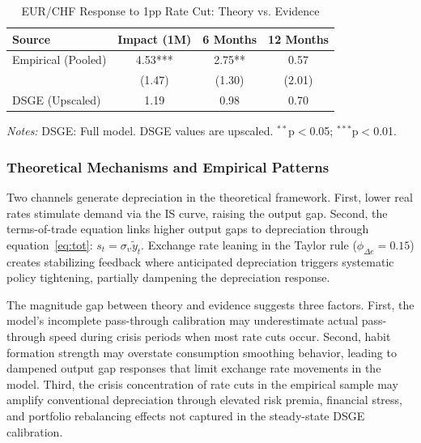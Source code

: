 \documentclass[12pt,a4paper]{article}
\begin{document}
\begin{table}[H]
	\centering
	\caption{EUR/CHF Response to 1pp Rate Cut: Theory vs. Evidence}
	\label{tab:fx_comparison}
	\small
	\begin{threeparttable}
		\begin{tabular}{@{}lccc@{}}
			\toprule
			\textbf{Source} & \textbf{Impact (1M)} & \textbf{6 Months} & \textbf{12 Months} \\
			\midrule
			Empirical (Pooled) & 4.53*** & 2.75** & 0.57 \\
			& (1.47) & (1.30) & (2.01) \\
			\midrule
			DSGE (Upscaled) & 1.19 & 0.98 & 0.70 \\
			\bottomrule
		\end{tabular}
		\begin{tablenotes}
			\footnotesize
			\item \textit{Notes:} DSGE: Full model. DSGE values are upscaled. $^{**}$p$<$0.05; $^{***}$p$<$0.01.
		\end{tablenotes}
	\end{threeparttable}
\end{table}

\subsubsection{Theoretical Mechanisms and Empirical Patterns}
Two channels generate depreciation in the theoretical framework. First, lower real rates stimulate demand via the IS curve, raising the output gap. Second, the terms-of-trade equation links higher output gaps to depreciation through equation~\eqref{eq:tot}: $s_t = \sigma_\upsilon\tilde{y}_t$. Exchange rate leaning in the Taylor rule ($\phi_{\Delta e} = 0.15$) creates stabilizing feedback where anticipated depreciation triggers systematic policy tightening, partially dampening the depreciation response.

The magnitude gap between theory and evidence suggests three factors. First, the model's incomplete pass-through calibration may underestimate actual pass-through speed during crisis periods when most rate cuts occur. Second, habit formation strength may overstate consumption smoothing behavior, leading to dampened output gap responses that limit exchange rate movements in the model. Third, the crisis concentration of rate cuts in the empirical sample may amplify conventional depreciation through elevated risk premia, financial stress, and portfolio rebalancing effects not captured in the steady-state DSGE calibration.
\end{document}
